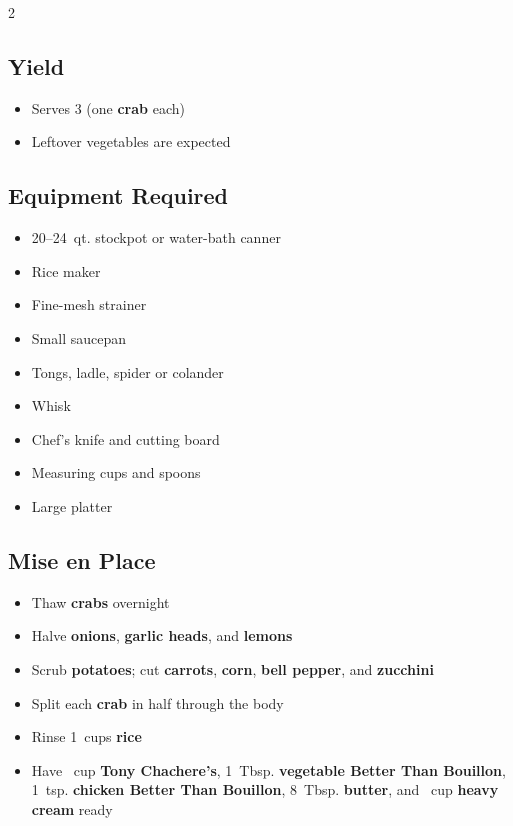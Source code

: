 \documentclass[11pt,letterpaper]{article}
\begin{document}
\newpage
{\footnotesize
\setlength{\columnsep}{20pt}
\setlength{\multicolsep}{6pt}
\begin{multicols}{2}
\setlength{\parindent}{0pt}
\setlength{\parskip}{2pt}
\setlength{\itemsep}{0pt}
\setlength{\parsep}{0pt}

\subsection*{Yield}
\begin{itemize}
    \item Serves 3 (one \textbf{crab} each)
    \item Leftover vegetables are expected
\end{itemize}

\subsection*{Equipment Required}
\begin{itemize}
    \item 20--24~qt. stockpot or water-bath canner
    \item Rice maker
    \item Fine-mesh strainer
    \item Small saucepan
    \item Tongs, ladle, spider or colander
    \item Whisk
    \item Chef's knife and cutting board
    \item Measuring cups and spoons
    \item Large platter
\end{itemize}

\subsection*{Mise en Place}
\begin{itemize}
    \item Thaw \textbf{crabs} overnight
    \item Halve \textbf{onions}, \textbf{garlic heads}, and \textbf{lemons}
    \item Scrub \textbf{potatoes}; cut \textbf{carrots}, \textbf{corn}, \textbf{bell pepper}, and \textbf{zucchini}
    \item Split each \textbf{crab} in half through the body
    \item Rinse 1~cups \textbf{rice}
    \item Have ~cup \textbf{Tony Chachere's}, 1~Tbsp. \textbf{vegetable Better Than Bouillon}, 1~tsp. \textbf{chicken Better Than Bouillon}, 8~Tbsp. \textbf{butter}, and ~cup \textbf{heavy cream} ready
\end{itemize}


\end{multicols}}
\end{document}
